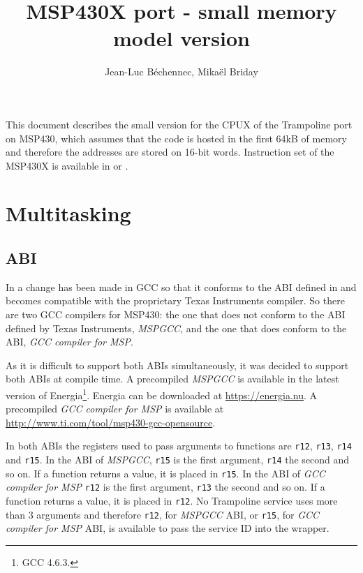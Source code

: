 \documentclass[11pt, oneside]{article}   	%
\title{MSP430X port - small memory model version}
\author{Jean-Luc Béchennec, Mikaël Briday}
\begin{document}
\maketitle

This document describes the small version for the CPUX of the Trampoline port on MSP430, which assumes that the code is hosted in the first 64kB of memory and therefore the addresses are stored on 16-bit words. Instruction set of the MSP430X is available in \cite{slau208q} or \cite{slau367o}.

\section{Multitasking}

\subsection{ABI}

In \cite{slaa664} a change has been made in GCC so that it conforms to the ABI defined in \cite{slaa534} and becomes compatible with the proprietary Texas Instruments compiler. So there are two GCC compilers for MSP430: the one that does not conform to the ABI defined by Texas Instruments, \emph{MSPGCC}, and the one that does conform to the ABI, \emph{GCC compiler for MSP}. 

As it is difficult to support both ABIs simultaneously, it was decided to support both ABIs at compile time. A precompiled \emph{MSPGCC} is available in the latest version of Energia\footnote{GCC 4.6.3.}. Energia can be downloaded at {\small\url{https://energia.nu}}. A precompiled \emph{GCC compiler for MSP} is available at {\small\url{http://www.ti.com/tool/msp430-gcc-opensource}}.

In both ABIs the registers used to pass arguments to functions are \lstinline{r12}, \lstinline{r13}, \lstinline{r14} and \lstinline{r15}. In the ABI of \emph{MSPGCC}, \lstinline{r15} is the first argument, \lstinline{r14} the second and so on. If a function returns a value, it is placed in \lstinline{r15}. In the ABI of \emph{GCC compiler for MSP} \lstinline{r12} is the first argument, \lstinline{r13} the second and so on. If a function returns a value, it is placed in \lstinline{r12}.
 No Trampoline service uses more than 3 arguments and therefore \lstinline{r12}, for \emph{MSPGCC} ABI, or \lstinline{r15}, for \emph{GCC compiler for MSP} ABI, is available to pass the service ID into the wrapper.
 
\end{document}
